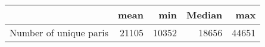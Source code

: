\begin{tabular}{lrrrr}
\toprule
{} &   mean &    min &  Median &    max \\
\midrule
Number of unique paris &  21105 &  10352 &   18656 &  44651 \\
\bottomrule
\end{tabular}
